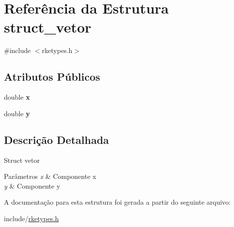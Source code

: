 \hypertarget{structstruct__vetor}{\section{Referência da Estrutura struct\-\_\-vetor}
\label{structstruct__vetor}
}


{\ttfamily \#include $<$rketypes.\-h$>$}

\subsection*{Atributos Públicos}
\begin{DoxyCompactItemize}
\item 
\hypertarget{structstruct__vetor_aae7646e904a8ce82b9c179ee26a0cc76}{double {\bfseries x}}\label{structstruct__vetor_aae7646e904a8ce82b9c179ee26a0cc76}

\item 
\hypertarget{structstruct__vetor_a73fafc2561b7eb18209e5ee4f6837b28}{double {\bfseries y}}\label{structstruct__vetor_a73fafc2561b7eb18209e5ee4f6837b28}

\end{DoxyCompactItemize}


\subsection{Descrição Detalhada}
Struct vetor 
\begin{DoxyParams}{Parâmetros}
{\em x} & Componente x \\
\hline
{\em y} & Componente y \\
\hline
\end{DoxyParams}


A documentação para esta estrutura foi gerada a partir do seguinte arquivo\-:\begin{DoxyCompactItemize}
\item 
include/\hyperlink{rketypes_8h}{rketypes.\-h}\end{DoxyCompactItemize}
